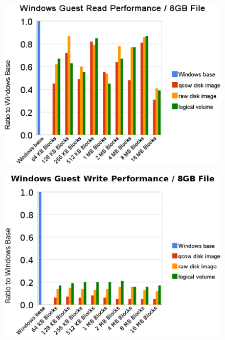 \begin{figure}[tbp]
\begin{centering}
\label{fig:windows-read-summary}
\includegraphics[scale=.7,angle=90]{figs/windows-read-summary}
\end{centering}
\end{figure}

\begin{figure}[tbp]
\begin{centering}
\label{fig:windows-write-summary}
\includegraphics[scale=.7,angle=90]{figs/windows-write-summary}
\end{centering}
\end{figure}

